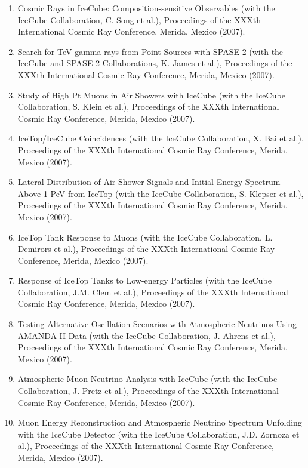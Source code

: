 \begin{enumerate}
\item Cosmic Rays in IceCube: Composition-sensitive Observables (with the IceCube Collaboration, C. Song et al.), Proceedings of the XXXth International Cosmic Ray Conference, Merida, Mexico (2007).

\item Search for TeV gamma-rays from Point Sources with SPASE-2 (with the IceCube and SPASE-2 Collaborations, K. James et al.), Proceedings of the XXXth International Cosmic Ray Conference, Merida, Mexico (2007).

\item Study of High Pt Muons in Air Showers with IceCube (with the IceCube Collaboration, S. Klein et al.), Proceedings of the XXXth International Cosmic Ray Conference, Merida, Mexico (2007).

\item IceTop/IceCube Coincidences (with the IceCube Collaboration, X. Bai et al.), Proceedings of the XXXth International Cosmic Ray Conference, Merida, Mexico (2007).

\item Lateral Distribution of Air Shower Signals and Initial Energy Spectrum Above 1 PeV from IceTop (with the IceCube Collaboration, S. Klepser et al.), Proceedings of the XXXth International Cosmic Ray Conference, Merida, Mexico (2007).

\item IceTop Tank Response to Muons (with the IceCube Collaboration, L. Demirors et al.), Proceedings of the XXXth International Cosmic Ray Conference, Merida, Mexico (2007).

\item Response of IceTop Tanks to Low-energy Particles (with the IceCube Collaboration, J.M. Clem et al.), Proceedings of the XXXth International Cosmic Ray Conference, Merida, Mexico (2007).

\item Testing Alternative Oscillation Scenarios with Atmospheric Neutrinos Using AMANDA-II Data (with the IceCube Collaboration, J. Ahrens et al.), Proceedings of the XXXth International Cosmic Ray Conference, Merida, Mexico (2007).

\item Atmospheric Muon Neutrino Analysis with IceCube (with the IceCube Collaboration, J. Pretz et al.), Proceedings of the XXXth International Cosmic Ray Conference, Merida, Mexico (2007).

\item Muon Energy Reconstruction and Atmospheric Neutrino Spectrum Unfolding with the IceCube Detector (with the IceCube Collaboration, J.D. Zornoza et al.), Proceedings of the XXXth International Cosmic Ray Conference, Merida, Mexico (2007).


\end{enumerate}

